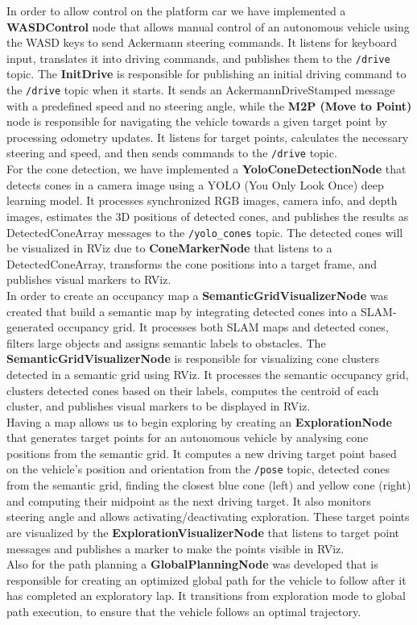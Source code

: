 In order to allow control on the platform car we have implemented a \textbf{WASDControl} node that allows manual control of an autonomous vehicle using the WASD keys to send Ackermann steering commands. It listens for keyboard input, translates it into driving commands, and publishes them to the \texttt{/drive} topic.
The \textbf{InitDrive} is responsible for publishing an initial driving command to the \texttt{/drive} topic when it starts. It sends an AckermannDriveStamped message with a predefined speed and no steering angle, while the \textbf{M2P (Move to Point)} node is responsible for navigating the vehicle towards a given target point by processing odometry updates. It listens for target points, calculates the necessary steering and speed, and then sends commands to the \texttt{/drive} topic.\\
\newline
For the cone detection, we have implemented a \textbf{YoloConeDetectionNode} that detects cones in a camera image using a YOLO (You Only Look Once) deep learning model. It processes synchronized RGB images, camera info, and depth images, estimates the 3D positions of detected cones, and publishes the results as DetectedConeArray messages to the \texttt{/yolo\_cones} topic.
The detected cones will be visualized in RViz due to \textbf{ConeMarkerNode} that listens to a DetectedConeArray, transforms the cone positions into a target frame, and publishes visual markers to RViz.\\
\newline
In order to create an occupancy map a \textbf{SemanticGridVisualizerNode} was created that build a semantic map by integrating detected cones into a SLAM-generated occupancy grid. It processes both SLAM maps and detected cones, filters large objects and assigns semantic labels to obstacles.
The \textbf{SemanticGridVisualizerNode} is responsible for visualizing cone clusters detected in a semantic grid using RViz. It processes the semantic occupancy grid, clusters detected cones based on their labels, computes the centroid of each cluster, and publishes visual markers to be displayed in RViz.\\
\newline
Having a map allows us to begin exploring by creating an \textbf{ExplorationNode} that generates target points for an autonomous vehicle by analysing cone positions from the semantic grid. It computes a new driving target point based on the vehicle's position and orientation from the \texttt{/pose} topic, detected cones from the semantic grid, finding the closest blue cone (left) and yellow cone (right) and computing their midpoint as the next driving target. It also monitors steering angle and allows activating/deactivating exploration.
These target points are visualized by the \textbf{ExplorationVisualizerNode} that listens to target point messages and publishes a marker to make the points visible in RViz.\\
\newline
Also for the path planning a \textbf{GlobalPlanningNode} was developed that is responsible for creating an optimized global path for the vehicle to follow after it has completed an exploratory lap. It transitions from exploration mode to global path execution, to ensure that the vehicle follows an optimal trajectory.
